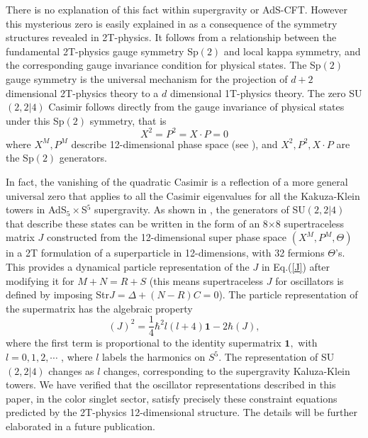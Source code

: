 \documentclass[a4paper,aps,preprint,nofootinbib]{revtex4}
\begin{document}
There is no explanation of this fact within supergravity or AdS-CFT. However
this mysterious zero is easily explained in \cite{AdS5S5} as a consequence
of the symmetry structures revealed in 2T-physics. It follows from a
relationship between the fundamental 2T-physics gauge symmetry Sp$\left(
2\right) $ and local kappa symmetry, and the corresponding gauge invariance
condition for physical states. The Sp$\left( 2\right) $ gauge symmetry is
the universal mechanism for the projection of $d+2$ dimensional 2T-physics
theory to a $d$ dimensional 1T-physics theory. The zero SU$\left(
2,2|4\right) $ Casimir follows directly from the gauge invariance of
physical states under this Sp$\left( 2\right) $ symmetry, that is
\begin{equation}
X^{2}=P^{2}=X\cdot P=0
\end{equation}%
where $X^{M},P^{M}$ describe 12-dimensional phase space (see \cite{survey2T}
), and $X^{2},P^{2},X\cdot P$ are the Sp$\left( 2\right) $ generators.

In fact, the vanishing of the quadratic Casimir is a reflection of
a more general universal zero that applies to all the Casimir
eigenvalues for all the Kakuza-Klein towers in AdS$_{5}\times
$S$^{5}$ supergravity. As shown in \cite{AdS5S5}, the generators
of SU$\left( 2,2|4\right) $ that describe these states can be
written in the form of an 8$\times 8$ supertraceless matrix $J$
constructed from the 12-dimensional super phase space $\left(
X^{M},P^{M},\Theta \right) $ in a 2T formulation of a
superparticle in 12-dimensions, with 32 fermions $\Theta $'s. This
provides a dynamical particle representation of the $J$ in
Eq.(\ref{J}) after modifying it for $M+N=R+S$ (this means
supertraceless $J$ for oscillators is defined by imposing
Str$J=\Delta+(N-R)C=0$). The particle representation of the
supermatrix has the algebraic property \cite{AdS5S5}
\begin{equation}
\left( J\right) ^{2}=\frac{1}{4}\hbar ^{2}l\left( l+4\right)
\mathbf{1-} 2\hbar \left( J\right) ,  \label{JJ}
\end{equation}%
where the first term is proportional to the identity supermatrix
$\mathbf{1,} $ with $l=0,1,2,\cdots $ , where $l$ labels the
harmonics on $S^{5}\mathbf{.} $ The representation of SU$\left(
2,2|4\right) $ changes as $l$ changes, corresponding to the
supergravity Kaluza-Klein towers. We have verified that the
oscillator representations described in this paper, in the color
singlet sector, satisfy precisely these constraint equations
predicted by the 2T-physics 12-dimensional structure. The details
will be further elaborated in a future publication.
\end{document}
